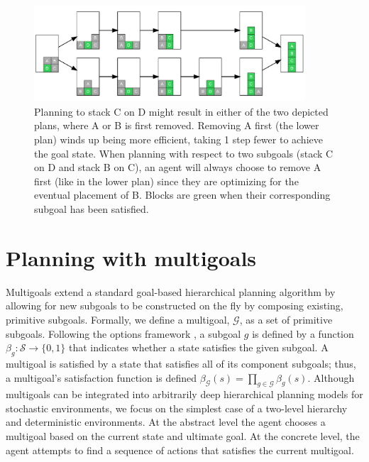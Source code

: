 \documentclass[10pt,letterpaper]{article}
\begin{document}
\begin{figure}[ht]
    \centering
    \includegraphics[width=0.9\textwidth]{example-4-block}
    \caption{Planning to stack C on D might result in either of the two depicted plans, where A or B is first removed. Removing A first (the lower plan) winds up being more efficient, taking 1 step fewer to achieve the goal state. When planning with respect to two subgoals (stack C on D and stack B on C), an agent will always choose to remove A first (like in the lower plan) since they are optimizing for the eventual placement of B. Blocks are green when their corresponding subgoal has been satisfied.}
    \label{fig:fourblock}
\end{figure}



\section{Planning with multigoals}
\newcommand{\multigoal}{\mathcal{G}}

Multigoals extend a standard goal-based hierarchical planning algorithm by allowing for new subgoals to be constructed on the fly by composing existing, primitive subgoals. Formally, we define a multigoal,  $\multigoal$, as a set of primitive subgoals. Following the options framework \citep{sutton1999between}, a subgoal $g$ is defined by a function 
$\beta_g: \mathcal{S} \rightarrow \{0, 1\}$
that indicates whether a state satisfies the given subgoal. A multigoal is satisfied by a state that satisfies all of its component subgoals; thus, a multigoal's satisfaction function is defined
$\beta_{\multigoal}(s) = \prod_{g \in \multigoal} \beta_g(s)$. Although multigoals can be integrated into arbitrarily deep hierarchical planning models for stochastic environments, we focus on the simplest case of a two-level hierarchy and deterministic environments. At the abstract level the agent chooses a multigoal based on the current state and ultimate goal. At the concrete level, the agent attempts to find a sequence of actions that satisfies the current multigoal.
\end{document}
